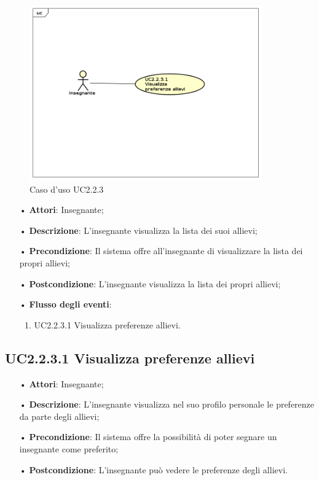 \begin{figure}[H]
\centering
\includegraphics[width=10cm]{img/UC223.png} 
\caption{Caso d'uso UC2.2.3}
\end{figure}

\begin{itemize}
	\item[•] \textbf{Attori}: Insegnante;
	\item[•] \textbf{Descrizione}: L’insegnante visualizza la lista dei suoi allievi;
	\item[•] \textbf{Precondizione}: Il sistema offre all’insegnante di visualizzare la lista dei propri allievi;
	\item[•] \textbf{Postcondizione}: L’insegnante visualizza la lista dei propri allievi;
	\item[•] \textbf{Flusso degli eventi}:
		\begin{enumerate}
			\item UC2.2.3.1 Visualizza preferenze allievi.
		\end{enumerate}
\end{itemize}

\subsection{UC2.2.3.1 Visualizza preferenze allievi}
\begin{itemize}
	\item[•] \textbf{Attori}: Insegnante;
	\item[•] \textbf{Descrizione}: L’insegnante visualizza nel suo profilo personale le preferenze da parte degli allievi;
	\item[•] \textbf{Precondizione}: Il sistema offre la possibilità di poter segnare un insegnante come preferito;
	\item[•] \textbf{Postcondizione}: L’insegnante può vedere le preferenze degli allievi.
\end{itemize}


